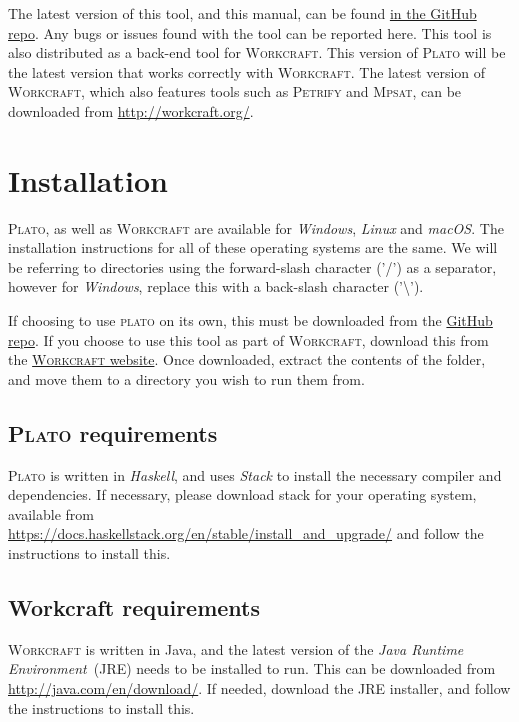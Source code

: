 \documentclass[british,technote,compsoc]{IEEEtran}
\newcommand{\noun}[1]{\textsc{#1}}
\begin{document}
The latest version of this tool, and this manual, can be found \href{https://github.com/tuura/plato}{in the GitHub repo}. Any bugs or issues found with the tool can be reported here. 
This tool is also distributed as a back-end tool for \noun{Workcraft}. This version of \noun{Plato} will be the latest version that works correctly with \noun{Workcraft}. The latest 
version of \noun{Workcraft}, which also features tools  such as \noun{Petrify} and \noun{Mpsat}, can be downloaded from \url{http://workcraft.org/}. 

\section{Installation}

\noun{Plato}, as well as \noun{Workcraft} are available for \emph{Windows}, \emph{Linux} and \emph{macOS}. The installation instructions for all of these operating systems are 
the same. We will be referring to directories using the forward-slash character ('/') as a separator, however for \emph{Windows}, replace this with a back-slash character 
('\textbackslash').

If choosing to use \noun{plato} on its own, this must be 
downloaded from the \href{https://github.com/tuura/plato}{GitHub repo}. If you choose to use this tool as part of \noun{Workcraft}, download this from the 
\href{http://workcraft.org/}{\noun{Workcraft} website}. Once downloaded, extract the contents of the folder, and move them to a directory you wish to run them from. 

\subsection{\noun{Plato} requirements\label{sub:Concepts_requirements}}

\noun{Plato} is written in \emph{Haskell}, and uses \emph{Stack} to install the necessary compiler and dependencies. If necessary, please download stack for your operating 
system, available from \\\url{https://docs.haskellstack.org/en/stable/install_and_upgrade/} and follow the instructions to install this.

\subsection{Workcraft requirements}

\noun{Workcraft} is written in Java, and the latest version of the \emph{Java Runtime Environment}~(JRE) needs to be installed to run.  This can be downloaded from 
\url{http://java.com/en/download/}. If needed, download the JRE installer, and follow the instructions to install this.
\end{document}
